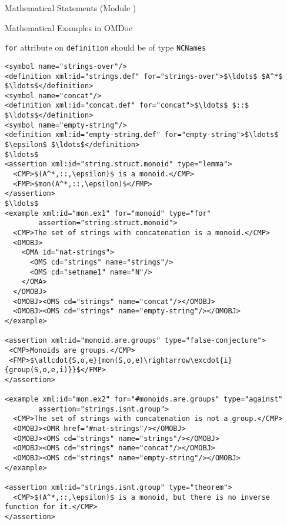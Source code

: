 \begin{tchapter}[id=statements,short=Mathematical Statements]{Mathematical Statements (Module {})}
\begin{tsection}[id=examples]{Mathematical Examples in OMDoc}
\begin{erratum}[reported-by=Michael Kohlhase,date=2009-08-11]{{\texttt{for}} attribute on
    {\texttt{definition}} should be of type {\texttt{NCNames}}}
\begin{lstlisting}[label=lst:example,mathescape,
  caption={An {\omdoc} representation of a mathematical example},
  index={example,for,type,assertion}]
<symbol name="strings-over"/>
<definition xml:id="strings.def" for="strings-over">$\ldots$ $A^*$ $\ldots$</definition>
<symbol name="concat"/>
<definition xml:id="concat.def" for="concat">$\ldots$ $::$ $\ldots$</definition>
<symbol name="empty-string"/>
<definition xml:id="empty-string.def" for="empty-string">$\ldots$ $\epsilon$ $\ldots$</definition>
$\ldots$
<assertion xml:id="string.struct.monoid" type="lemma">
  <CMP>$(A^*,::,\epsilon)$ is a monoid.</CMP>
  <FMP>$mon(A^*,::,\epsilon)$</FMP>
</assertion>
$\ldots$
<example xml:id="mon.ex1" for="monoid" type="for"
        assertion="string.struct.monoid">
  <CMP>The set of strings with concatenation is a monoid.</CMP>
  <OMOBJ>
    <OMA id="nat-strings">
      <OMS cd="strings" name="strings"/>
      <OMS cd="setname1" name="N"/>
    </OMA>
  </OMOBJ>
  <OMOBJ><OMS cd="strings" name="concat"/></OMOBJ>
  <OMOBJ><OMS cd="strings" name="empty-string"/></OMOBJ>
</example>

<assertion xml:id="monoid.are.groups" type="false-conjecture">
 <CMP>Monoids are groups.</CMP>
 <FMP>$\allcdot{S,o,e}{mon(S,o,e)\rightarrow\excdot{i}{group(S,o,e,i)}}$</FMP>
</assertion>

<example xml:id="mon.ex2" for="#monoids.are.groups" type="against"
        assertion="strings.isnt.group">
  <CMP>The set of strings with concatenation is not a group.</CMP>
  <OMOBJ><OMR href="#nat-strings"/></OMOBJ>
  <OMOBJ><OMS cd="strings" name="strings"/></OMOBJ>
  <OMOBJ><OMS cd="strings" name="concat"/></OMOBJ>
  <OMOBJ><OMS cd="strings" name="empty-string"/></OMOBJ>
</example>

<assertion xml:id="strings.isnt.group" type="theorem">
  <CMP>$(A^*,::,\epsilon)$ is a monoid, but there is no inverse function for it.</CMP>
</assertion>
\end{lstlisting}
\end{erratum}


\end{tsection}
\end{tchapter}
